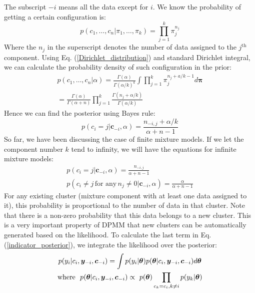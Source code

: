 %
The subscript $-i$ means all the data except for $i$.
We know the probability of getting a certain configuration is:
\begin{equation}
p(c_1,\dots, c_n|\pi_1, \dots, \pi_k) = \prod_{j=1}^k \pi_j^{n_j}
\label{configuration_probability}
\end{equation}
Where the $n_j$ in the superscript denotes the number of data assigned to the $j^\text{th}$ component.
Using Eq. (\ref{Dirichlet_distribution}) and standard Dirichlet integral, we can calculate the probability density of such configuration in the prior:
\begin{equation}
\begin{gathered}
p(c_1, \dots, c_n | \alpha) =  \frac{\Gamma(\alpha)}
{\Gamma(\alpha / k)^k} \int \prod_{j=1}^k \pi_j^{n_j + a/k - 1} d\bm{\pi}
\\
= \frac{\Gamma(\alpha)}{\Gamma(\alpha + n)} 
\prod_{j=1}^k \frac{\Gamma(n_j + \alpha/k)}{\Gamma(\alpha/k)}
\end{gathered}
\label{indicator_prior}
\end{equation}
Hence we can find the posterior using Bayes rule:
\begin{equation}
p(c_i =j | \bm{c}_{-i} , \alpha) = 
\frac{n_{-i, j} + \alpha /k}{\alpha + n - 1}
\label{indicator_posterior_2}
\end{equation}
%
So far, we have been discussing the case of finite mixture models. If we let the component number $k$ tend to infinity, we will have the equations for infinite mixture models:
\begin{equation}
\begin{gathered}
p(c_i =j | \bm{c}_{-i} , \alpha) = 
\frac{n_{-i, j}}{\alpha + n - 1}
\\
p(c_i \neq j \, \text{for any} \, n_j \neq 0 | \bm{c}_{-i} , \alpha) = 
\frac{\alpha}{\alpha + n - 1}
\end{gathered}
\label{indicator_posterior_3}
\end{equation}
For any existing cluster (mixture component with at least one data assigned to it), this probability is proportional to the number of data in that cluster. 
Note that there is a non-zero probability that this data belongs to a new cluster. 
This is a very important property of DPMM that new clusters can be automatically generated based on the likelihood. 
To calculate the last term in Eq. (\ref{indicator_posterior}), we integrate the likelihood over the posterior:
\begin{equation}
\begin{gathered}
p(y_i|c_i, \bm{y}_{-i}, \bm{c}_{-i}) = 
\int p(y_i|\bm{\theta})
p(\bm{\theta}|c_i, \bm{y}_{-i}, \bm{c}_{-i})
d\bm{\theta}
%
\\
%
\text{where \,\,} 
p(\bm{\theta}|c_i, \bm{y}_{-i}, \bm{c}_{-i}) \propto
\,\, p(\bm{\theta})
\prod_{c_k=c_i, k \neq i} p(y_k|\bm{\theta})
\end{gathered}
\label{integral_1}
\end{equation}
